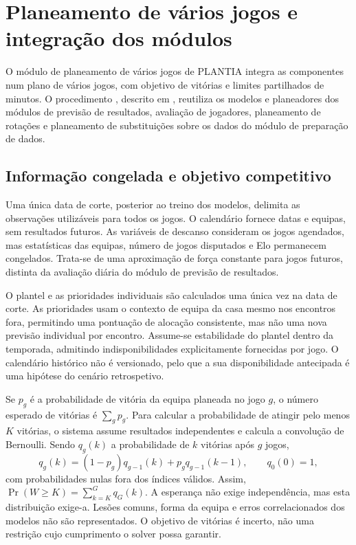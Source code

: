\chapter{Planeamento de vários jogos e integração dos módulos}
\label{chap:horizonte}

O módulo de planeamento de vários jogos de PLANTIA integra as componentes num plano de vários jogos,
com objetivo de vitórias e limites partilhados de minutos. O procedimento
, descrito em
, reutiliza os modelos e planeadores dos
módulos de previsão de resultados, avaliação de jogadores, planeamento de rotações e planeamento de substituições sobre os dados do módulo de preparação de dados.

\section{Informação congelada e objetivo competitivo}

Uma única data de corte, posterior ao treino dos modelos, delimita as
observações utilizáveis para todos os jogos. O calendário fornece datas
e equipas, sem resultados futuros. As variáveis de descanso consideram
os jogos agendados, mas estatísticas das equipas, número de jogos disputados
e Elo permanecem congelados. Trata-se de uma aproximação de força constante
para jogos futuros, distinta da avaliação diária do módulo de previsão de resultados.

O plantel e as prioridades individuais são calculados uma única vez na
data de corte. As prioridades usam o contexto de equipa da casa mesmo
nos encontros fora, permitindo uma pontuação de alocação consistente,
mas não uma nova previsão individual por encontro. Assume-se estabilidade
do plantel dentro da temporada, admitindo indisponibilidades explicitamente
fornecidas por jogo. O calendário histórico não é versionado, pelo que a
sua disponibilidade antecipada é uma hipótese do cenário retrospetivo.

Se \(p_g\) é a probabilidade de vitória da equipa planeada no jogo \(g\),
o número esperado de vitórias é \(\sum_g p_g\). Para calcular a probabilidade
de atingir pelo menos \(K\) vitórias, o sistema assume resultados
independentes e calcula a convolução de Bernoulli. Sendo \(q_g(k)\) a
probabilidade de \(k\) vitórias após \(g\) jogos,
\[
q_g(k)=(1-p_g)q_{g-1}(k)+p_gq_{g-1}(k-1),\qquad q_0(0)=1,
\]
com probabilidades nulas fora dos índices válidos. Assim,
\(\Pr(W\geq K)=\sum_{k=K}^{G}q_G(k)\).
A esperança não exige independência, mas esta distribuição exige-a.
Lesões comuns, forma da equipa e erros correlacionados dos modelos não
são representados. O objetivo de vitórias é incerto, não uma restrição
cujo cumprimento o solver possa garantir.

